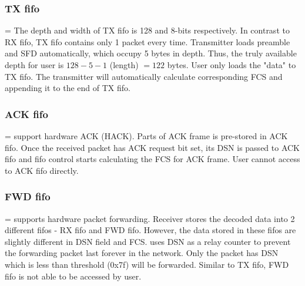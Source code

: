 \subsubsection{TX fifo}
\hangindent=\parindent
{}
The depth and width of TX fifo is 128 and 8-bits respectively. In contrast to RX fifo, 
TX fifo contains only 1 packet every time. Transmitter loads preamble
and SFD automatically, which occupy 5 bytes in depth. Thus, the truly available depth for
user is $128 - 5 - 1$ (length) $= 122$ bytes. User only loads the "data" to TX fifo. The 
transmitter will automatically calculate corresponding FCS and appending it to the end
of TX fifo. 

\subsubsection{ACK fifo}
\hangindent=\parindent
{}
\sdr support hardware ACK (HACK). Parts of ACK frame is pre-stored in ACK fifo. Once the received packet
has ACK request bit set, its DSN is passed to ACK fifo and fifo control starts calculating the FCS
for ACK frame. User cannot access to ACK fifo directly.

\subsubsection{FWD fifo}
\hangindent=\parindent
{}
\sdr supports hardware packet forwarding. Receiver stores the decoded data into 2 different fifos - 
RX fifo and FWD fifo. However, the data stored in these fifos are slightly different in DSN field
and FCS. \sdr uses DSN as a relay counter to prevent the forwarding packet last forever in the network.
Only the packet has DSN which is less than threshold (0x7f) will be forwarded. Similar to TX fifo,
FWD fifo is not able to be accessed by user.

\clearpage
